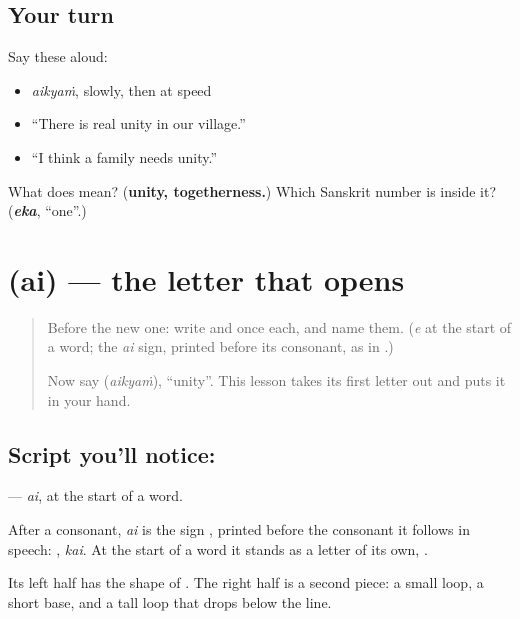 \subsection*{Your turn}
Say these aloud:

\begin{itemize}
\raggedright
  \item \emph{aikyaṁ}, slowly, then at speed
  \item \textquotedblleft{}There is real unity in our village.\textquotedblright{}
  \item \textquotedblleft{}I think a family needs unity.\textquotedblright{}
\end{itemize}

\begin{tcolorbox}[breakable,colback=teal!4,colframe=teal!35!black,title={Before you move on}]
What does \textbf{} mean? (\textbf{unity, togetherness.}) Which Sanskrit number is inside it? (\emph{\textbf{eka}}, \textquotedblleft{}one\textquotedblright{}.)
\end{tcolorbox}
\section[\texorpdfstring{\ml{ഐ} (ai)}{ഐ (ai)}]{ (ai) — the letter that opens }

\label{lesson:ML-W341-ai}



\begin{quote}
Before the new one: write \textbf{} and \textbf{} once each, and name them. (\emph{e} at the start of a word; the \emph{ai} sign, printed before its consonant, as in \textbf{}.)

Now say \textbf{} (\emph{aikyaṁ}), \textquotedblleft{}unity\textquotedblright{}. This lesson takes its first letter out and puts it in your hand.
\end{quote}

\subsection*{Script you'll notice: }
\textbf{} — \emph{ai}, at the start of a word.

After a consonant, \emph{ai} is the sign \textbf{}, printed before the consonant it follows in speech: \textbf{}, \emph{kai}. At the start of a word it stands as a letter of its own, \textbf{}.

Its left half has the shape of \textbf{}. The right half is a second piece: a small loop, a short base, and a tall loop that drops below the line.

